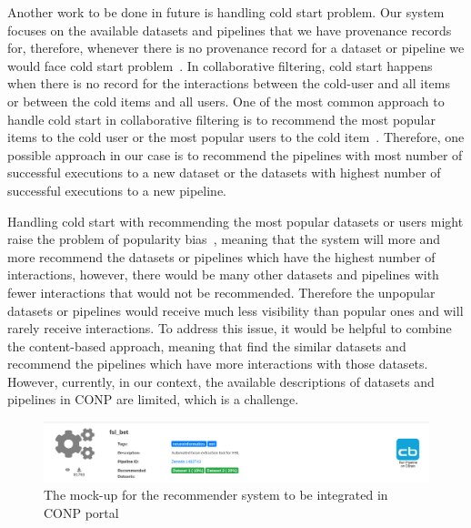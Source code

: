 Another work to be done in future is handling cold start problem. Our system focuses on the available datasets and pipelines that we have provenance records for, therefore, whenever there is no provenance record for a dataset or pipeline we would face cold start problem~\cite{lika2014facing}. In collaborative filtering, cold start happens when there is no record for the interactions between the cold-user and all items or between the cold items and all users. One of the most common approach to handle cold start in collaborative filtering is to recommend the most popular items to the cold user or the most popular users to the cold item~\cite{ravichandranstate}. Therefore, one possible approach in our case is to recommend the pipelines with most number of successful executions to a new dataset or the datasets with highest number of successful executions to a new pipeline.

Handling cold start with recommending the most popular datasets or users might raise the problem of popularity bias~\cite{abdollahpouri2017controlling}, meaning that the system will more and more recommend the datasets or pipelines which have the highest number of interactions, however, there would be many other datasets and pipelines with fewer interactions that would not be recommended. Therefore the unpopular datasets or pipelines would receive much less visibility than popular ones and will rarely receive interactions. To address this issue, it would be helpful to combine the content-based approach, meaning that find the similar datasets and recommend the pipelines which have more interactions with those datasets. However, currently, in our context, the available descriptions of datasets and pipelines in CONP are limited, which is a challenge. 




\begin{figure}
    \centering
    \includegraphics[width=\textwidth]{figures/mockup.png}
    \caption{The mock-up for the recommender system to be integrated in CONP portal}
    \label{fig:mockup}
\end{figure}
